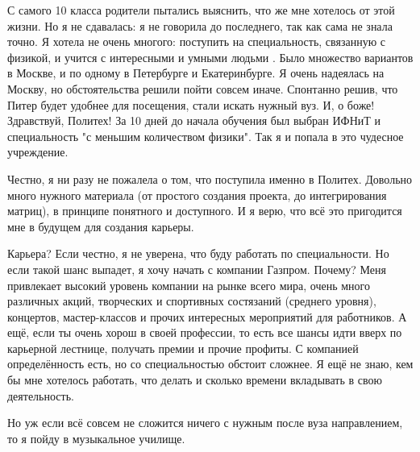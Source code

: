 \documentclass[12pt]{article}
\date{}
\begin{document}
    
    С самого 10 класса родители пытались выяснить, что же мне хотелось от этой жизни. Но я не сдавалась: я не говорила до последнего, так как сама не знала точно. Я хотела не очень многого: поступить на специальность, связанную с физикой, и учится с интересными и умными людьми . Было множество вариантов в Москве, и по одному в Петербурге и Екатеринбурге. Я очень надеялась на Москву, но обстоятельства решили пойти совсем иначе. Спонтанно решив, что Питер будет удобнее для посещения, стали искать нужный вуз. И, о боже! Здравствуй,  Политех! За 10 дней до начала обучения был выбран ИФНиТ и специальность "с меньшим количеством физики". Так я и попала в это чудесное учреждение.
     
    Честно, я ни разу не пожалела о том, что поступила именно в Политех. Довольно много нужного материала (от простого создания проекта, до интегрирования матриц), в принципе понятного и доступного. И я верю, что всё это пригодится мне в будущем для создания карьеры. 
    
    Карьера? Если честно, я не уверена, что буду работать по специальности. Но если такой шанс выпадет, я хочу начать с компании Газпром. Почему? Меня привлекает высокий уровень компании на рынке всего мира, очень много различных акций, творческих и спортивных состязаний (среднего уровня), концертов, мастер-классов и прочих интересных мероприятий для работников. А ещё, если ты очень хорош в своей профессии, то есть все шансы идти вверх по карьерной лестнице, получать премии и прочие профиты. С компанией определённость есть, но со специальностью обстоит сложнее. Я ещё не знаю, кем бы мне хотелось работать, что делать и сколько времени вкладывать в свою деятельность.
    
    Но уж если всё совсем не сложится ничего с нужным после вуза направлением, то я пойду в музыкальное училище. 
\end{document}
